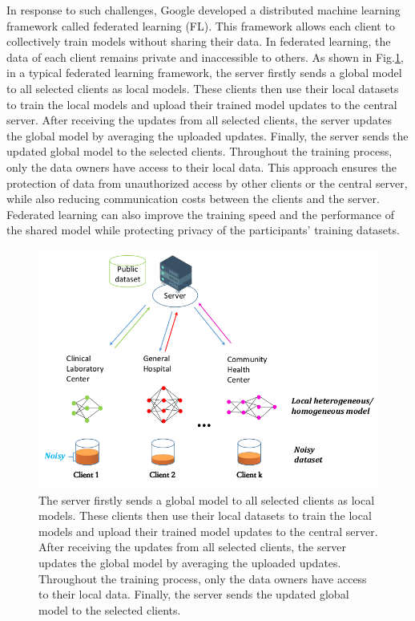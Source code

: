 \documentclass[conference]{IEEEtran}
\begin{document}
In response to such challenges, Google \cite{b3} developed a distributed 
machine learning framework called federated learning (FL). 
This framework allows each client 
to collectively train models without sharing their data.
In federated learning, the data of each client remains private and inaccessible 
to others. 
As shown in Fig.\ref{fig1}, in a typical federated learning framework, 
the server firstly sends a global model to all selected clients as local models. 
These clients then use their local datasets to train the 
local models and upload their trained model updates to the central server.
After receiving the updates from all selected clients, 
the server updates the global model by averaging the uploaded updates.
Finally, the server sends the updated global model to the selected clients. 
Throughout the training process, only the data owners 
have access to their local data. 
This approach ensures the protection of data 
from unauthorized access by other clients or the central server, 
while also reducing communication costs between the clients and the server. 
Federated learning can also improve the training speed and the performance of the
shared model while protecting privacy of the participants' training datasets\cite{b4}.


\begin{figure}[htbp]
    \centerline{\includegraphics[width=0.8\linewidth,height=0.6\linewidth]{picture/f1.png}}
    \caption{The server firstly sends a global model to all selected clients as local models. 
    These clients then use their local datasets to train the 
    local models and upload their trained model updates to the central server.
    After receiving the updates from all selected clients, 
    the server updates the global model by averaging the uploaded updates. 
    Throughout the training process, only the data owners 
    have access to their local data. Finally, the server sends the updated global model to the selected clients.}
    \label{fig1}
\end{figure}
\end{document}
